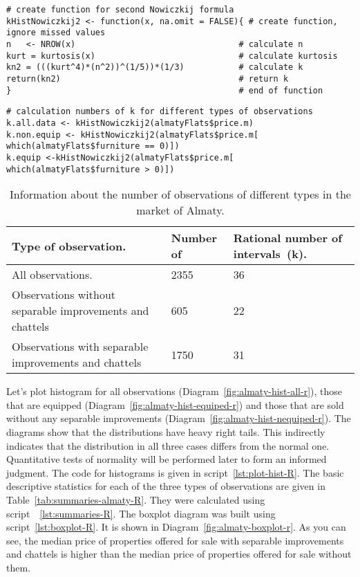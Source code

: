\documentclass[]{scrreprt}
\begin{document}
%
\begin{lstlisting}[float=htp, caption = Create a function to calculate~k using Nowiczkij's formula, firstnumber=1, label= lst:k-number-Nowiczkij-R]
# create function for second Nowiczkij formula
kHistNowiczkij2 <- function(x, na.omit = FALSE){ # create function, ignore missed values
n   <- NROW(x)                                 # calculate n
kurt = kurtosis(x)                             # calculate kurtosis
kn2 = (((kurt^4)*(n^2))^(1/5))*(1/3)           # calculate k
return(kn2)                                    # return k  
}                                              # end of function
\end{lstlisting} 
%
\begin{lstlisting}[float=htp, caption = Calculation of~k for observations of different types by Nowiczkij's formula., firstnumber=1, label= lst:k-number-R]
# calculation numbers of k for different types of observations
k.all.data <- kHistNowiczkij2(almatyFlats$price.m)
k.non.equip <- kHistNowiczkij2(almatyFlats$price.m[ which(almatyFlats$furniture == 0)])
k.equip <-kHistNowiczkij2(almatyFlats$price.m[ which(almatyFlats$furniture > 0)])                                       
\end{lstlisting}
%
\begin{table}[htp]
	\caption{Information about the number of observations of different types in the market of Almaty.}\label{tab:numbers-of-observations-almaty-R}
	\centering
	\begin{tabular}{lll}
		\hline
		Type of observation.&Number of&Rational number of intervals~(k).\\
		\hline
		All observations.&2355&36\\
		\hline
		Observations without separable improvements and chattels&605&22\\
		\hline
		Observations with separable improvements and chattels&1750&31\\
		\hline
	\end{tabular}
\end{table}
%
Let's plot histogram for all observations (Diagram~\ref{fig:almaty-hist-all-r}), those that are equipped (Diagram~\ref{fig:almaty-hist-equiped-r}) and those that are sold without any separable improvements (Diagram~\ref{fig:almaty-hist-nequiped-r}). The diagrams show that the distributions have heavy right tails. This indirectly indicates that the distribution in all three cases differs from the normal one. Quantitative tests of normality will be performed later to form an informed judgment. The code for histograms is given in script~\ref{lst:plot-hist-R}. The basic descriptive statistics for each of the three types of observations are given in Table~\ref{tab:summaries-almaty-R}. They were calculated using script~~\ref{lst:summaries-R}. The boxplot diagram was built using script~\ref{lst:boxplot-R}. It is shown in Diagram~\ref{fig:almaty-boxplot-r}. As you can see, the median price of properties offered for sale with separable improvements and chattels is higher than the median price of properties offered for sale without them.
\end{document}
